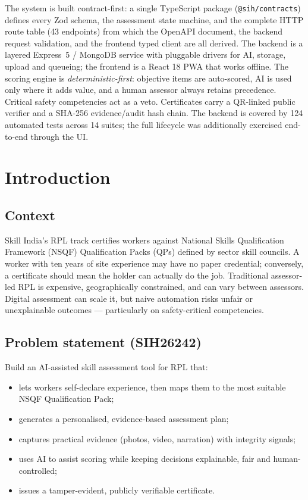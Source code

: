\documentclass[11pt,a4paper]{article}
\newcommand{\code}[1]{\texttt{\small #1}}
\begin{document}
The system is built contract-first: a single TypeScript package
(\code{@sih/contracts}) defines every Zod schema, the assessment state
machine, and the complete HTTP route table (43 endpoints) from which the
OpenAPI document, the backend request validation, and the frontend typed
client are all derived. The backend is a layered Express~5 / MongoDB service
with pluggable drivers for AI, storage, upload and queueing; the frontend is
a React 18 PWA that works offline. The scoring engine is
\emph{deterministic-first}: objective items are auto-scored, AI is used only
where it adds value, and a human assessor always retains precedence. Critical
safety competencies act as a veto. Certificates carry a QR-linked public
verifier and a SHA-256 evidence/audit hash chain. The backend is covered by
124 automated tests across 14 suites; the full lifecycle was additionally
exercised end-to-end through the UI.

{\small\tableofcontents}
\newpage

\section{Introduction}
\subsection{Context}
Skill India's RPL track certifies workers against National Skills
Qualification Framework (NSQF) Qualification Packs (QPs) defined by sector
skill councils. A worker with ten years of site experience may have no paper
credential; conversely, a certificate should mean the holder can actually do
the job. Traditional assessor-led RPL is expensive, geographically
constrained, and can vary between assessors. Digital assessment can scale it,
but naive automation risks unfair or unexplainable outcomes --- particularly
on safety-critical competencies.

\subsection{Problem statement (SIH26242)}
Build an AI-assisted skill assessment tool for RPL that:
\begin{itemize}
\item lets workers self-declare experience, then maps them to the most
      suitable NSQF Qualification Pack;
\item generates a personalised, evidence-based assessment plan;
\item captures practical evidence (photos, video, narration) with
      integrity signals;
\item uses AI to assist scoring while keeping decisions explainable,
      fair and human-controlled;
\item issues a tamper-evident, publicly verifiable certificate.
\end{itemize}
\end{document}

